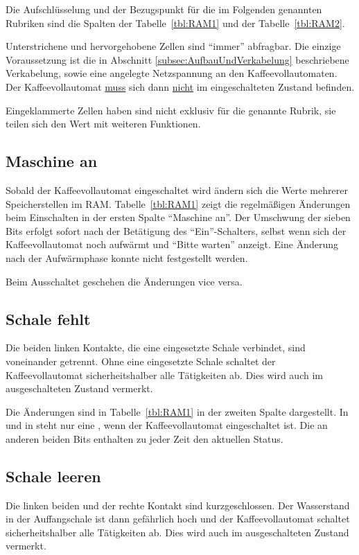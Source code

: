 Die Aufschlüsselung und der Bezugspunkt für die im Folgenden genannten Rubriken sind die Spalten der Tabelle~\ref{tbl:RAM1} und der Tabelle~\ref{tbl:RAM2}.

Unterstrichene und hervorgehobene Zellen sind "`immer"' abfragbar.
Die einzige Voraussetzung ist die in Abschnitt \ref{subsec:AufbauUndVerkabelung} beschriebene Verkabelung, sowie eine angelegte Netzspannung an den Kaffeevollautomaten.
Der Kaffeevollautomat \underline{muss} sich dann \underline{nicht} im eingeschalteten Zustand befinden.

Eingeklammerte Zellen haben sind nicht exklusiv für die genannte Rubrik, sie teilen sich den Wert mit weiteren Funktionen.

\subsection{Maschine an}
Sobald der Kaffeevollautomat eingeschaltet wird ändern sich die Werte mehrerer Speicherstellen im \ac{RAM}.
Tabelle~\ref{tbl:RAM1} zeigt die regelmäßigen Änderungen beim Einschalten in der ersten Spalte "`Maschine an"'.
Der Umschwung der sieben Bits erfolgt sofort nach der Betätigung des "`Ein"'-Schalters, selbst wenn sich der Kaffeevollautomat noch aufwärmt und "`Bitte warten"' anzeigt.
Eine Änderung nach der Aufwärmphase konnte nicht festgestellt werden.

Beim Ausschaltet geschehen die Änderungen vice versa.

\subsection{Schale fehlt}
Die beiden linken Kontakte, die eine eingesetzte Schale verbindet, sind voneinander getrennt.
Ohne eine eingesetzte Schale schaltet der Kaffeevollautomat sicherheitshalber alle Tätigkeiten ab.
Dies wird auch im ausgeschalteten Zustand vermerkt.

Die Änderungen sind in Tabelle~\ref{tbl:RAM1} in der zweiten Spalte dargestellt.
In  und in  steht nur eine , wenn der Kaffeevollautomat eingeschaltet ist.
Die an anderen beiden Bits enthalten zu jeder Zeit den aktuellen Status.

\subsection{Schale leeren}
Die linken beiden und der rechte Kontakt sind kurzgeschlossen.
Der Wasserstand in der Auffangschale ist dann gefährlich hoch und der Kaffeevollautomat schaltet sicherheitshalber alle Tätigkeiten ab.
Dies wird auch im ausgeschalteten Zustand vermerkt.

